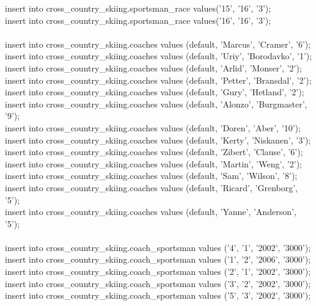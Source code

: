 \documentclass[a4paper,12pt]{article}
\begin{document}
insert into cross\_country\_skiing.sportsman\_race values('15', '16',  '3');\\
insert into cross\_country\_skiing.sportsman\_race values('16', '16',  '3');\\
\\
insert into cross\_country\_skiing.coaches values (default, 'Marcus',  'Cramer',  '6');\\
insert into cross\_country\_skiing.coaches values (default, 'Uriy',  'Borodavko', '1');\\
insert into cross\_country\_skiing.coaches values (default, 'Arlid', 'Monser',  '2');\\
insert into cross\_country\_skiing.coaches values (default, 'Petter',  'Bransdal',  '2');\\
insert into cross\_country\_skiing.coaches values (default, 'Gury',  'Hetland', '2');\\
insert into cross\_country\_skiing.coaches values (default, 'Alonzo',  'Burgmaster',  '9');\\
insert into cross\_country\_skiing.coaches values (default, 'Doren', 'Aber',  '10');\\
insert into cross\_country\_skiing.coaches values (default, 'Kerty', 'Niskanen',  '3');\\
insert into cross\_country\_skiing.coaches values (default, 'Zibert',  'Clause',  '6');\\
insert into cross\_country\_skiing.coaches values (default, 'Martin',  'Weng',  '2');\\
insert into cross\_country\_skiing.coaches values (default, 'Sam', 'Wilson',  '8');\\
insert into cross\_country\_skiing.coaches values (default, 'Ricard',  'Grenborg',  '5');\\
insert into cross\_country\_skiing.coaches values (default, 'Yanne', 'Anderson',  '5');\\
\\
insert into cross\_country\_skiing.coach\_sportsman values ('4',  '1', '2002',  '3000');\\
insert into cross\_country\_skiing.coach\_sportsman values ('1',  '2', '2006',  '3000');\\
insert into cross\_country\_skiing.coach\_sportsman values ('2',  '1', '2002',  '3000');\\
insert into cross\_country\_skiing.coach\_sportsman values ('3',  '2', '2002',  '3000');\\
insert into cross\_country\_skiing.coach\_sportsman values ('5',  '3', '2002',  '3000');\\
\end{document}
